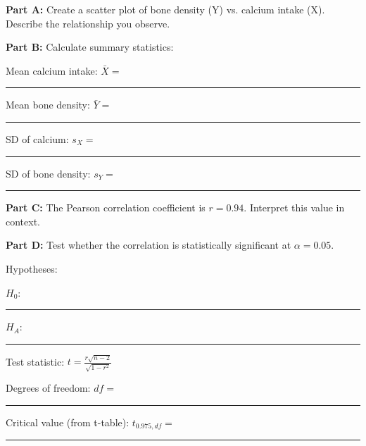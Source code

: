 \documentclass[11pt]{article}
\begin{document}
\vspace{0.5cm}

\textbf{Part A:} Create a scatter plot of bone density (Y) vs. calcium intake (X). Describe the relationship you observe.

\vspace{4cm}

\textbf{Part B:} Calculate summary statistics:

\vspace{0.3cm}

Mean calcium intake: $\bar{X} = $ \rule{3cm}{0.4pt}

\vspace{0.3cm}

Mean bone density: $\bar{Y} = $ \rule{3cm}{0.4pt}

\vspace{0.3cm}

SD of calcium: $s_X = $ \rule{3cm}{0.4pt}

\vspace{0.3cm}

SD of bone density: $s_Y = $ \rule{3cm}{0.4pt}

\vspace{1cm}

\textbf{Part C:} The Pearson correlation coefficient is $r = 0.94$. Interpret this value in context.

\vspace{3cm}

\newpage

\textbf{Part D:} Test whether the correlation is statistically significant at $\alpha = 0.05$.

\vspace{0.3cm}

Hypotheses:

$H_0$: \rule{5cm}{0.4pt}

$H_A$: \rule{5cm}{0.4pt}

\vspace{0.5cm}

Test statistic: $t = \frac{r\sqrt{n-2}}{\sqrt{1-r^2}}$

\vspace{3cm}

Degrees of freedom: $df = $ \rule{2cm}{0.4pt}

\vspace{0.5cm}

Critical value (from t-table): $t_{0.975, df} = $ \rule{2cm}{0.4pt}

\vspace{0.5cm}
\end{document}
